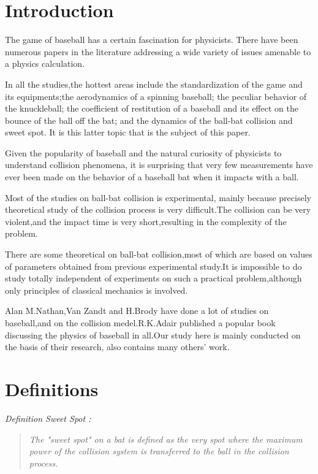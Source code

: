 \documentclass[12pt]{article}
\newtheorem{definition}{{definition}}
\newcounter{numdefinition}
\renewenvironment{definition}[1]
{\noindent\stepcounter{numdefinition}
\slshape Definition \arabic{numdefinition} \textsf{#1 :}
\begin{quote}\small\itshape}
{\end{quote}}
\begin{document}
\newcommand{\vw}{\frac{v_i}{\omega_i}}

\section{Introduction}

The game of baseball has a certain fascination for physicists.
There have been numerous papers in the literature addressing a wide
variety of issues amenable to a physics calculation.

In all the studies,the hottest areas include the standardization of the game and its equipments;the aerodynamics of a spinning baseball; the peculiar behavior of the knuckleball; the coefficient of restitution of a baseball and its effect on the bounce of the ball off the bat; and the dynamics of the ball-bat collision and sweet spot. It is this latter topic that is the subject of this paper.

Given the popularity of baseball and the natural curiosity
of physicists to understand collision phenomena, it is surprising
that very few measurements have ever been made on the
behavior of a baseball bat when it impacts with a ball.

Most of the studies on ball-bat collision is experimental, mainly because precisely theoretical study of the collision process is very difficult.The collision can be very violent,and the impact time is very short,resulting in the complexity of the problem.

There are some theoretical on ball-bat collision,most of which are based on values of parameters obtained from previous experimental study.It is impossible to do study totally independent of experiments on such a
practical problem,although only principles of classical mechanics is involved.

Alan M.Nathan,Van Zandt and H.Brody have done a lot of studies on baseball,and on the collision medel.R.K.Adair published a popular book discussing the physics of baseball in all.Our study here is mainly conducted on the basis of their research, also contains many others' work.

\section{Definitions}
\begin{definition}{Sweet Spot}
 The "sweet spot" on a bat is defined as the very spot where the maximum power of the collision system is transferred to the ball in the collision process.
\end{definition}
\end{document}
